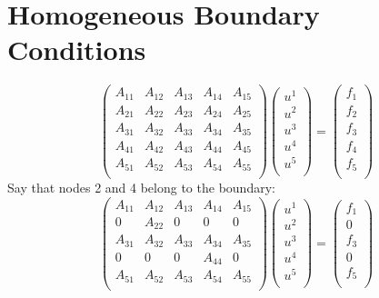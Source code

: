 \documentclass[11pt]{amsart}
\begin{document}
\section{Homogeneous Boundary Conditions}
\[
\left(
\begin{array}{ccccc}
A_{11} & A_{12} & A_{13} & A_{14} & A_{15} \\
A_{21} & A_{22} & A_{23} & A_{24} & A_{25} \\ 
A_{31} & A_{32} & A_{33} & A_{34} & A_{35} \\ 
A_{41} & A_{42} & A_{43} & A_{44} & A_{45} \\ 
A_{51} & A_{52} & A_{53} & A_{54} & A_{55} \\ 
\end{array}
\right)
\left(
\begin{array}{c}
u^1\\
u^2\\
u^3\\
u^4\\
u^5\\
\end{array}
\right)
= 
\left(
\begin{array}{c}
f_1\\
f_2\\
f_3\\
f_4\\
f_5\\
\end{array}
\right)
\]
Say that nodes 2 and 4 belong to the boundary:
\[
\left(
\begin{array}{ccccc}
A_{11} & A_{12} & A_{13} & A_{14} & A_{15} \\
0      & A_{22} & 0      & 0      & 0 \\ 
A_{31} & A_{32} & A_{33} & A_{34} & A_{35} \\ 
0 &  0 & 0      & A_{44} & 0 \\ 
A_{51} & A_{52} & A_{53} & A_{54} & A_{55} \\ 
\end{array}
\right)
\left(
\begin{array}{c}
u^1\\
u^2\\
u^3\\
u^4\\
u^5\\
\end{array}
\right)
= 
\left(
\begin{array}{c}
f_1\\
0\\
f_3\\
0\\
f_5\\
\end{array}
\right)
\]
\appendix
\end{document}
